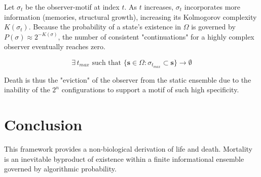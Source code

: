 \documentclass[11pt]{article}
\begin{document}
Let $\sigma_t$ be the observer-motif at index $t$. As $t$ increases, $\sigma_t$ incorporates more information (memories, structural growth), increasing its Kolmogorov complexity $K(\sigma_t)$. Because the probability of a state's existence in $\Omega$ is governed by $P(\sigma) \approx 2^{-K(\sigma)}$, the number of consistent "continuations" for a highly complex observer eventually reaches zero. 



\begin{equation}
    \exists \, t_{max} \text{ such that } \{ \mathbf{s} \in \Omega : \sigma_{t_{max}} \subset \mathbf{s} \} \to \emptyset
\end{equation}

Death is thus the "eviction" of the observer from the static ensemble due to the inability of the $2^n$ configurations to support a motif of such high specificity.

\section{Conclusion}
This framework provides a non-biological derivation of life and death. Mortality is an inevitable byproduct of existence within a finite informational ensemble governed by algorithmic probability.
\end{document}

